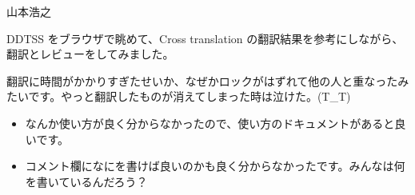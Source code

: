\begin{prework}{山本浩之}


DDTSS をブラウザで眺めて、Cross translation の翻訳結果を参考にしながら、翻訳とレビューをしてみました。


翻訳に時間がかかりすぎたせいか、なぜかロックがはずれて他の人と重なったみたいです。やっと翻訳したものが消えてしまった時は泣けた。(T\_T)


\begin{itemize}
 \item なんか使い方が良く分からなかったので、使い方のドキュメントがあると良いです。
 \item コメント欄になにを書けば良いのかも良く分からなかったです。みんなは何を書いているんだろう？
\end{itemize}

\end{prework}

